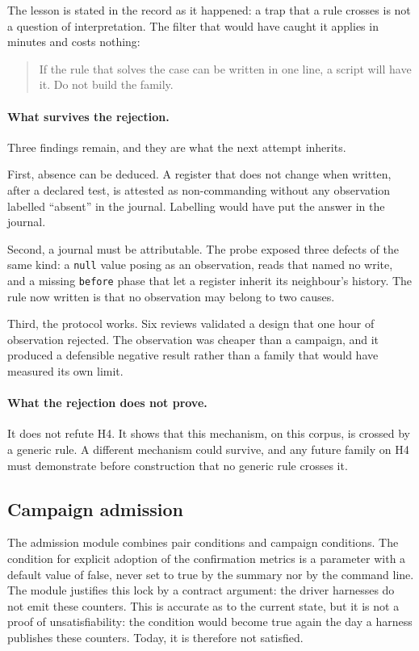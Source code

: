 The lesson is stated in the record as it happened: a trap that a rule crosses is
not a question of interpretation. The filter that would have caught it applies
in minutes and costs nothing:

\begin{quote}
If the rule that solves the case can be written in one line, a script will have
it. Do not build the family.
\end{quote}

\paragraph{What survives the rejection.} Three findings remain, and they are
what the next attempt inherits.

First, absence can be deduced. A register that does not change when written,
after a declared test, is attested as non-commanding without any observation
labelled ``absent'' in the journal. Labelling would have put the answer in the
journal.

Second, a journal must be attributable. The probe exposed three defects of the
same kind: a \texttt{null} value posing as an observation, reads that named no
write, and a missing \texttt{before} phase that let a register inherit its
neighbour's history. The rule now written is that no observation may belong to
two causes.

Third, the protocol works. Six reviews validated a design that one hour of
observation rejected. The observation was cheaper than a campaign, and it
produced a defensible negative result rather than a family that would have
measured its own limit.

\paragraph{What the rejection does not prove.} It does not refute H4. It shows
that this mechanism, on this corpus, is crossed by a generic rule. A different
mechanism could survive, and any future family on H4 must demonstrate before
construction that no generic rule crosses it.

\subsection{Campaign admission}

The admission module combines pair conditions and campaign conditions. The
condition for explicit adoption of the confirmation metrics is a parameter with a
default value of false, never set to true by the summary nor by the command line.
The module justifies this lock by a contract argument: the driver harnesses do not
emit these counters. This is accurate as to the current state, but it is not a proof
of unsatisfiability: the condition would become true again the day a harness
publishes these counters. Today, it is therefore not satisfied.


